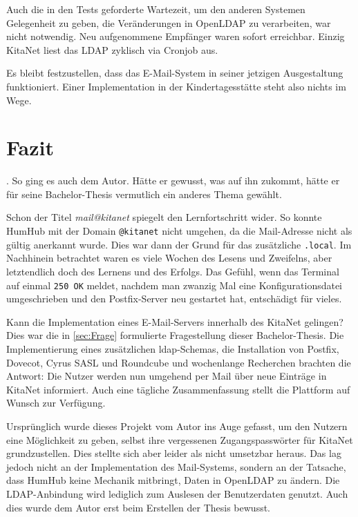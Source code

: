 Auch die in den Tests geforderte Wartezeit, um den anderen Systemen Gelegenheit zu geben, die Veränderungen in OpenLDAP zu verarbeiten, war nicht notwendig. Neu aufgenommene Empfänger waren sofort erreichbar. Einzig KitaNet liest das LDAP zyklisch via Cronjob aus.

Es bleibt festzustellen, dass das E-Mail-System in seiner jetzigen Ausgestaltung funktioniert. Einer Implementation in der Kindertagesstätte steht also nichts im Wege.

\chapter{Fazit}
\label{sec:Fazit}

 \citep[][1109]{Kofler2020}. 
So ging es auch dem Autor. Hätte er gewusst, was auf ihn zukommt, hätte er für seine Bachelor-Thesis vermutlich ein anderes Thema gewählt. 


Schon der Titel \textit{mail@kitanet} spiegelt den Lernfortschritt wider. 
So konnte HumHub mit der Domain \verb+@kitanet+ nicht umgehen, da die Mail-Adresse nicht als gültig anerkannt wurde. 
Dies war dann der Grund für das zusätzliche \verb+.local+.
Im Nachhinein betrachtet waren es viele Wochen des Lesens und Zweifelns, aber letztendlich doch des Lernens und des Erfolgs.
Das Gefühl, wenn das Terminal auf einmal \verb+250 OK+ meldet, nachdem man zwanzig Mal eine Konfigurationsdatei umgeschrieben und den Postfix-Server neu gestartet hat, entschädigt für vieles.

Kann die Implementation eines E-Mail-Servers innerhalb des KitaNet gelingen? Dies war die in \autoref{sec:Frage} formulierte Fragestellung dieser Bachelor-Thesis. 
Die Implementierung eines zusätzlichen \ac{ldap}-Schemas, die Installation von Postfix, Dovecot, Cyrus SASL und Roundcube und wochenlange Recherchen brachten die Antwort: 
Die Nutzer werden nun umgehend per Mail über neue Einträge in KitaNet informiert. Auch eine tägliche Zusammenfassung stellt die Plattform  auf Wunsch zur Verfügung.

Ursprünglich wurde dieses Projekt vom Autor ins Auge gefasst, um den Nutzern eine Möglichkeit zu geben, selbst ihre vergessenen Zugangspasswörter für KitaNet grundzustellen.
Dies stellte sich aber leider als nicht umsetzbar heraus. 
Das lag jedoch nicht an der Implementation des Mail-Systems, sondern an der Tatsache, dass HumHub keine Mechanik mitbringt, Daten in OpenLDAP zu ändern. 
Die LDAP-Anbindung wird lediglich zum Auslesen der Benutzerdaten genutzt. 
Auch dies wurde dem Autor erst beim Erstellen der Thesis bewusst.

